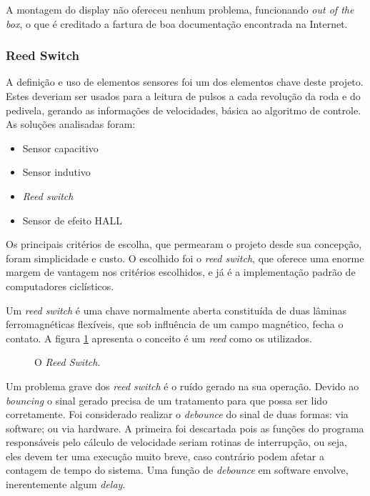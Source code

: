 \documentclass[a4paper,11pt]{article}
\begin{document}
A montagem do display não ofereceu nenhum problema, funcionando \textit{out of
the box}, o que é creditado a fartura de boa documentação encontrada na
Internet.

\subsubsection{Reed Switch}
\label{sec:reed}

A definição e uso de elementos sensores foi um dos elementos chave deste
projeto. Estes deveriam ser usados para a leitura de pulsos a cada revolução da
roda e do pedivela, gerando as informações de velocidades, básica ao algoritmo
de controle. As soluções analisadas foram:
\begin{itemize}
 \item Sensor capacitivo
 \item Sensor indutivo
 \item \textit{Reed switch}
 \item Sensor de efeito HALL
\end{itemize}
Os principais critérios de escolha, que permearam o projeto desde sua concepção,
foram simplicidade e custo. O escolhido foi o  \textit{reed switch}, que
oferece uma enorme margem de vantagem nos critérios escolhidos, e já é a
implementação padrão de computadores ciclísticos.

Um \textit{reed switch} é uma chave normalmente aberta constituída de duas
lâminas ferromagnéticas flexíveis, que sob influência de um campo magnético,
fecha o contato. A figura \ref{fig:reed} apresenta o conceito é um
\textit{reed} como os utilizados.

\begin{figure}[h!]
 \centering
   \hfil
  \caption{O \textit{Reed Switch}.}
  \label{fig:reed}
\end{figure}



Um problema grave dos \textit{reed switch} é o ruído gerado na
sua operação. Devido ao \textit{bouncing}\cite{reed} o sinal gerado precisa de
um tratamento para que possa ser lido corretamente. Foi considerado realizar o
\textit{debounce} do sinal de duas formas: via software; ou via hardware. A
primeira foi descartada pois as funções do programa responsáveis pelo
cálculo de velocidade seriam rotinas de interrupção, ou seja, eles devem ter uma
execução muito breve, caso contrário podem afetar a contagem de tempo do
sistema. Uma função de \textit{debounce} em software envolve, inerentemente
algum \textit{delay}.
\end{document}
